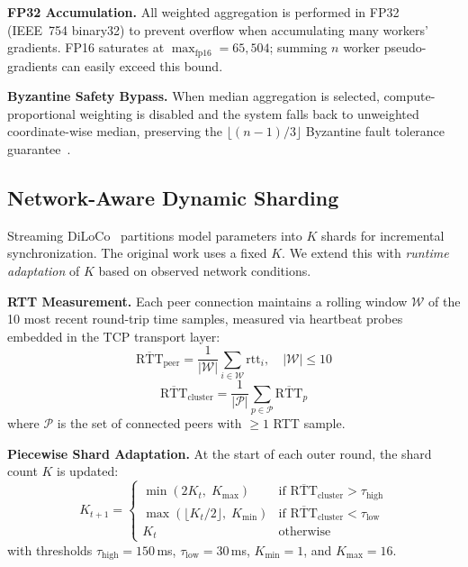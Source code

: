 \documentclass[10pt,conference]{IEEEtran}
\begin{document}
\textbf{FP32 Accumulation.} All weighted aggregation is performed in FP32
(IEEE~754 binary32) to prevent overflow when accumulating many workers'
gradients. FP16 saturates at $\max_{\text{fp16}} = 65{,}504$; summing $n$
worker pseudo-gradients can easily exceed this bound.

\textbf{Byzantine Safety Bypass.} When median aggregation is selected,
compute-proportional weighting is disabled and the system falls back to
unweighted coordinate-wise median, preserving the $\lfloor(n{-}1)/3\rfloor$
Byzantine fault tolerance guarantee~\cite{yin2018byzantine}.

\subsection{Network-Aware Dynamic Sharding}
\label{sec:dynamic-sharding}

Streaming DiLoCo~\cite{douillard2025streaming} partitions model parameters
into $K$ shards for incremental synchronization. The original work uses a
fixed $K$. We extend this with \emph{runtime adaptation} of $K$ based on
observed network conditions.

\textbf{RTT Measurement.} Each peer connection maintains a rolling window
$\mathcal{W}$ of the 10 most recent round-trip time samples, measured via
heartbeat probes embedded in the TCP transport layer:
\begin{equation}
  \overline{\text{RTT}}_{\text{peer}} =
  \frac{1}{|\mathcal{W}|}\sum_{i \in \mathcal{W}} \text{rtt}_i, \quad
  |\mathcal{W}| \leq 10
  \label{eq:rtt-peer}
\end{equation}
\begin{equation}
  \overline{\text{RTT}}_{\text{cluster}} =
  \frac{1}{|\mathcal{P}|}\sum_{p \in \mathcal{P}}
  \overline{\text{RTT}}_p
  \label{eq:rtt-cluster}
\end{equation}
where $\mathcal{P}$ is the set of connected peers with $\geq 1$ RTT sample.

\textbf{Piecewise Shard Adaptation.} At the start of each outer round, the
shard count $K$ is updated:
\begin{equation}
  K_{t+1} = \begin{cases}
    \min(2K_t,\; K_{\max}) & \text{if } \overline{\text{RTT}}_{\text{cluster}}
      > \tau_{\text{high}} \\[4pt]
    \max(\lfloor K_t / 2 \rfloor,\; K_{\min}) & \text{if }
      \overline{\text{RTT}}_{\text{cluster}} < \tau_{\text{low}} \\[4pt]
    K_t & \text{otherwise}
  \end{cases}
  \label{eq:shard-adapt}
\end{equation}
with thresholds $\tau_{\text{high}}{=}150$\,ms, $\tau_{\text{low}}{=}30$\,ms,
$K_{\min}{=}1$, and $K_{\max}{=}16$.
\end{document}
